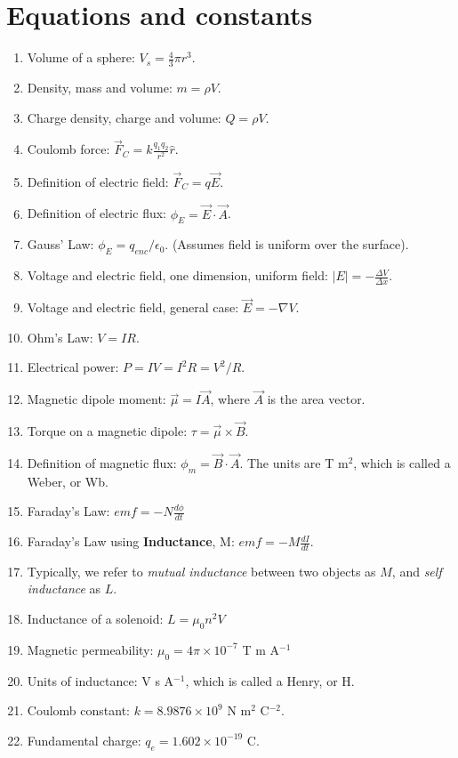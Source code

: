 \documentclass[10pt]{article}
\begin{document}
\maketitle

\section{Equations and constants}

\begin{enumerate}
\item Volume of a sphere: $V_s = \frac{4}{3}\pi r^3$.
\item Density, mass and volume: $m = \rho V$.
\item Charge density, charge and volume: $Q = \rho V$.
\item Coulomb force: $\vec{F}_C = k \frac{q_1 q_2}{r^2}\hat{r}$.
\item Definition of electric field: $\vec{F}_C = q\vec{E}$.
\item Definition of electric flux: $\phi_E = \vec{E} \cdot \vec{A}$.
\item Gauss' Law: $\phi_E = q_{enc}/\epsilon_0$. (Assumes field is uniform over the surface).
\item Voltage and electric field, one dimension, uniform field: $|E| = - \frac{\Delta V}{\Delta x}$.
\item Voltage and electric field, general case: $\vec{E} = -\nabla V$.
\item Ohm's Law: $V = IR$.
\item Electrical power: $P = IV = I^2 R = V^2/R$.
\item Magnetic dipole moment: $\vec{\mu} = I \vec{A}$, where $\vec{A}$ is the area vector.
\item Torque on a magnetic dipole: $\tau = \vec{\mu} \times \vec{B}$.
\item Definition of magnetic flux: $\phi_m = \vec{B} \cdot \vec{A}$.  The units are T m$^2$, which is called a Weber, or Wb.
\item Faraday's Law: $emf = -N \frac{d \phi}{d t}$
\item Faraday's Law using \textbf{Inductance}, M: $emf = -M \frac{dI}{dt}$.
\item Typically, we refer to \textit{mutual inductance} between two objects as $M$, and \textit{self inductance} as $L$.
\item Inductance of a solenoid: $L = \mu_0 n^2 V$
\item Magnetic permeability: $\mu_0 = 4\pi \times 10^{-7}$ T m A$^{-1}$
\item Units of inductance: V s A$^{-1}$, which is called a Henry, or H.
\item Coulomb constant: $k = 8.9876 \times 10^{9}$ N m$^2$ C$^{-2}$.
\item Fundamental charge: $q_e = 1.602 \times 10^{-19}$ C.
\end{enumerate}
\end{document}
